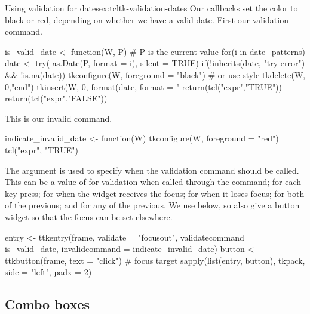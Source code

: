 \begin{example}{Using validation for dates}{ex:tcltk-validation-dates}
Our callbacks set the color to black or red, depending on whether we
have a valid date. First our validation command.
\begin{Schunk}
\begin{Sinput}
 is_valid_date <- function(W, P) { # P is the current value
   for(i in date_patterns) {
     date <- try( as.Date(P, format = i), silent = TRUE)
     if(!inherits(date, "try-error") && !is.na(date)) {
       tkconfigure(W, foreground = "black")  # or use style
       tkdelete(W, 0,"end")
       tkinsert(W, 0, format(date, format = "%
       return(tcl("expr","TRUE"))        
     } 
   }
   return(tcl("expr","FALSE"))
 }
\end{Sinput}
\end{Schunk}

This is our invalid command.
\begin{Schunk}
\begin{Sinput}
 indicate_invalid_date <- function(W) {
   tkconfigure(W, foreground = "red")
   tcl("expr", "TRUE")
 }
\end{Sinput}
\end{Schunk}


The  argument is used to specify when the
validation command should be called. This can be a value of
 for validation when called through the 
command;  for each key press;  for when the
widget receives the focus;  for when it loses focus;
 for both of the previous; and  for any of the
previous. We use  below, so also give a button widget
so that the focus can be set elsewhere. 
\begin{Schunk}
\begin{Sinput}
 entry <- ttkentry(frame, validate = "focusout",
                   validatecommand = is_valid_date,
                   invalidcommand = indicate_invalid_date)
 button <- ttkbutton(frame, text = "click")  # focus target
 sapply(list(entry, button), tkpack, side = "left", padx = 2)
\end{Sinput}
\end{Schunk}
              
\end{example}


\subsection{Combo boxes}
\label{sec:tcltk:comboboxes}

